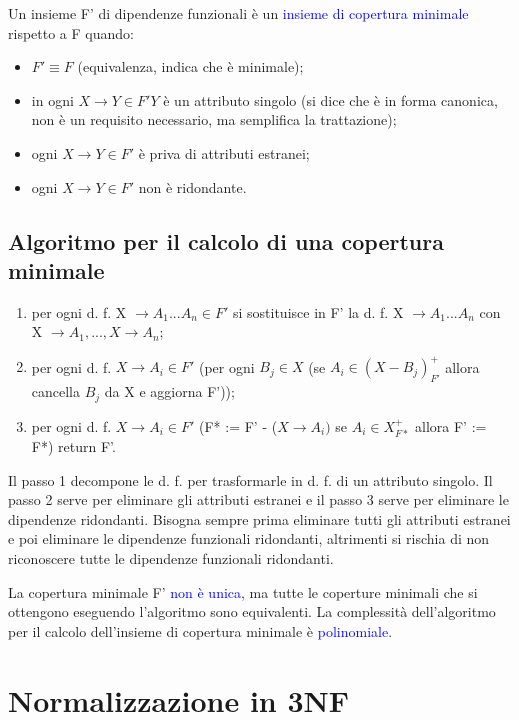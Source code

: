 Un insieme F' di dipendenze funzionali è un \textcolor{blue}{insieme di copertura minimale} rispetto a F quando:

\begin{itemize}
    \item $F' \equiv F$ (equivalenza, indica che è minimale);
    \item in ogni $X \rightarrow Y \in F' Y$ è un attributo singolo (si dice che è in forma canonica, non è un requisito necessario, ma semplifica la trattazione);
    \item ogni $X \rightarrow Y \in F'$ è priva di attributi estranei;
    \item ogni $X \rightarrow Y \in F'$ non è ridondante.
\end{itemize}

\subsection{Algoritmo per il calcolo di una copertura minimale}

\begin{enumerate}
    \item per ogni d. f. X $\rightarrow A_1 ... A_n \in F'$ si sostituisce in F' la d. f. X $\rightarrow A_1 ... A_n$ con X $\rightarrow A_1, ..., X \rightarrow A_n$;
    \item per ogni d. f. $X \rightarrow A_i \in F'$ (per ogni $B_j \in X$ (se $A_i \in (X-B_j)^+_{F'}$ allora cancella $B_j$ da X e aggiorna F'));
    \item per ogni d. f. $X \rightarrow A_i \in F'$ (F* := F' - ($X \rightarrow A_i)$ se $A_i \in X^+_{F*}$ allora F' := F*) return F'.
\end{enumerate}

Il passo 1 decompone le d. f. per trasformarle in d. f. di un attributo singolo. Il passo 2 serve per eliminare gli attributi estranei e il passo 3 serve per eliminare le dipendenze ridondanti. Bisogna sempre prima eliminare tutti gli attributi estranei e poi eliminare le dipendenze funzionali ridondanti, altrimenti si rischia di non riconoscere tutte le
dipendenze funzionali ridondanti. 

La copertura minimale F' \textcolor{blue}{non è unica}, ma tutte le coperture minimali che si ottengono eseguendo l'algoritmo sono equivalenti. La complessità dell’algoritmo per il calcolo dell’insieme di copertura minimale è \textcolor{blue}{polinomiale}.

\section{Normalizzazione in 3NF}

